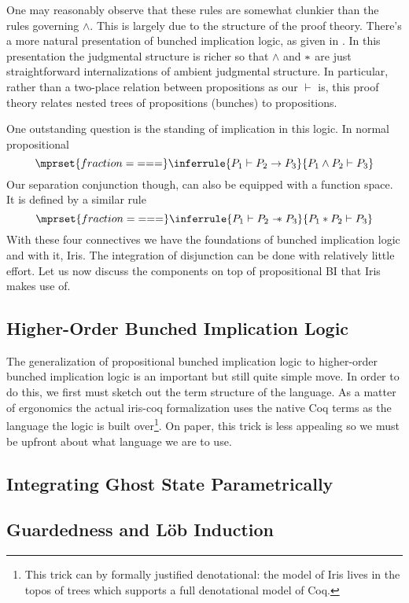 \documentclass{amsart}
\newcommand{\limplies}{\to}
\begin{document}
One may reasonably observe that these rules are somewhat clunkier than
the rules governing $\land$. This is largely due to the structure of
the proof theory. There's a more natural presentation of bunched
implication logic, as given in \citet{OHearn:99}. In this presentation
the judgmental structure is richer so that $\land$ and $\ast$ are just
straightforward internalizations of ambient judgmental structure. In
particular, rather than a two-place relation between propositions as
our $\vdash$ is, this proof theory relates nested trees of
propositions (bunches) to propositions.

One outstanding question is the standing of implication in this
logic. In normal propositional
\[
  \mprset{fraction={===}}
  \inferrule{
    P_1 \vdash P_2 \limplies P_3
  }{P_1 \land P_2 \vdash P_3}
\]
Our separation conjunction though, can also be equipped with a
function space. It is defined by a similar rule
\[
  \mprset{fraction={===}}
  \inferrule{
    P_1 \vdash P_2 \wand P_3
  }{P_1 \sep P_2 \vdash P_3}
\]
With these four connectives we have the foundations of bunched
implication logic and with it, Iris. The integration of disjunction
can be done with relatively little effort. Let us now discuss the
components on top of propositional BI that Iris makes use of.

\subsection{Higher-Order Bunched Implication Logic}

The generalization of propositional bunched implication logic to
higher-order bunched implication logic is an important but still quite
simple move. In order to do this, we first must sketch out the term
structure of the language. As a matter of ergonomics the actual
iris-coq formalization uses the native Coq terms as the language
the logic is built over\footnote{This trick can by formally justified
  denotational: the model of Iris lives in the topos of trees which
  supports a full denotational model of Coq.}. On paper, this trick is
less appealing so we must be upfront about what language we are to use.

\subsection{Integrating Ghost State Parametrically}

\subsection{Guardedness and L\"ob Induction}
\end{document}
